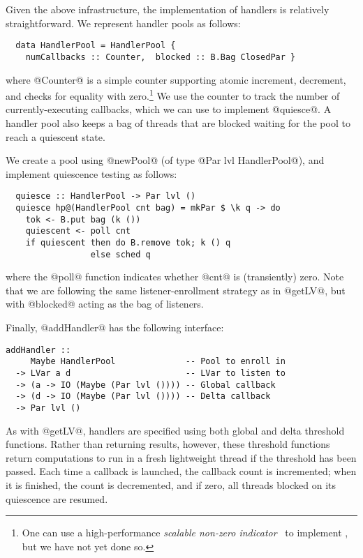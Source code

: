 Given the above infrastructure, the implementation of handlers is
relatively straightforward.  We represent handler pools as follows:

\singlespacing
\begin{lstlisting}
  data HandlerPool = HandlerPool {
    numCallbacks :: Counter,  blocked :: B.Bag ClosedPar }
\end{lstlisting}
\doublespacing

where @Counter@ is a simple counter supporting atomic increment,
decrement, and checks for equality with zero.\footnote{One can use a
  high-performance \emph{scalable non-zero indicator}~\cite{snzi} to
  implement , but we have not yet done so.}  We use the
counter to track the number of currently-executing callbacks, which we
can use to implement @quiesce@.  A handler pool also keeps a bag of
threads that are blocked waiting for the pool to reach a quiescent
state.

We create a pool using @newPool@ (of type @Par lvl HandlerPool@), and
implement quiescence testing as follows:

\singlespacing
\begin{lstlisting}
  quiesce :: HandlerPool -> Par lvl ()
  quiesce hp@(HandlerPool cnt bag) = mkPar $ \k q -> do
    tok <- B.put bag (k ())
    quiescent <- poll cnt
    if quiescent then do B.remove tok; k () q
                 else sched q
\end{lstlisting}
\doublespacing

where the @poll@ function indicates whether @cnt@ is (transiently)
zero.  Note that we are following the same listener-enrollment
strategy as in @getLV@, but with @blocked@ acting as the bag of
listeners.

Finally, @addHandler@ has the following interface:

\singlespacing
\begin{lstlisting}
addHandler :: 
     Maybe HandlerPool              -- Pool to enroll in
  -> LVar a d                       -- LVar to listen to
  -> (a -> IO (Maybe (Par lvl ()))) -- Global callback
  -> (d -> IO (Maybe (Par lvl ()))) -- Delta callback
  -> Par lvl ()
\end{lstlisting}
\doublespacing

As with @getLV@, handlers are specified using both global and delta
threshold functions.  Rather than returning results, however, these
threshold functions return computations to run in a fresh lightweight
thread if the threshold has been passed.  Each time a callback is
launched, the callback count is incremented; when it is finished, the
count is decremented, and if zero, all threads blocked on its
quiescence are resumed.

